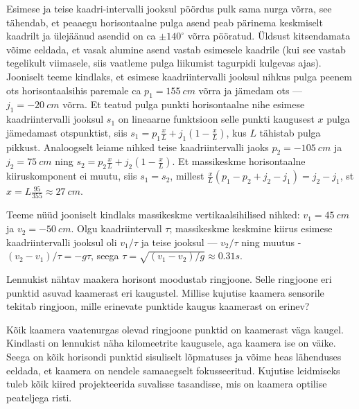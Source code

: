 \documentclass[10pt]{article}
\begin{document}

\solu
Esimese ja teise kaadri-intervalli jooksul pöördus pulk sama nurga võrra, see tähendab, et peaaegu horisontaalne pulga asend peab pärinema keskmiselt kaadrilt ja ülejäänud asendid on ca $\pm 140^\circ$ võrra pööratud. Üldsust kitsendamata võime eeldada, et vasak alumine asend vastab esimesele kaadrile (kui see vastab tegelikult viimasele, siis vaatleme pulga liikumist tagurpidi kulgevas ajas). Jooniselt teeme kindlaks, et esimese kaadriintervalli jooksul nihkus pulga peenem ots horisontaalsihis paremale ca $p_1=\SI{155}{cm}$ võrra ja jämedam ots --- $j_1=\SI{-20}{cm}$  võrra. Et teatud pulga punkti horisontaalne nihe esimese kaadriintervalli jooksul $s_1$ on lineaarne funktsioon selle punkti kaugusest $x$ pulga jämedamast otspunktist, siis $s_1=p_1\frac xL+j_1(1-\frac xL)$, kus $L$ tähistab pulga pikkust. Analoogselt leiame nihked teise kaadriintervalli jaoks $p_2=\SI{-105}{cm}$ ja $j_2=\SI{75}{cm}$ ning $s_2=p_2\frac xL+j_2(1-\frac xL)$. Et massikeskme horisontaalne kiiruskomponent ei muutu, siis $s_1=s_2$, millest $\frac xL(p_1-p_2+j_2-j_1)=j_2-j_1$, st $x=L\frac{95}{355}\approx \SI{27}{cm}$.

Teeme nüüd jooniselt kindlaks massikeskme vertikaalsihilised nihked: $v_1=\SI{45}{cm}$ ja $v_2=\SI{-50}{cm}$.
Olgu kaadriintervall $\tau$; massikeskme keskmine kiirus esimese kaadriintervalli jooksul oli $v_1/\tau$ ja teise jooksul --- $v_2/\tau$ ning muutus - $(v_2-v_1)/\tau= -g\tau$, seega $\tau=\sqrt{(v_1-v_2)/g}\approx \SI{0.31}s$.
\probend
\bigskip


\solu
Lennukist nähtav maakera horisont moodustab ringjoone. Selle ringjoone eri punktid asuvad kaamerast eri kaugustel. Millise kujutise kaamera sensorile tekitab ringjoon, mille erinevate punktide kaugus kaamerast on erinev?

Kõik kaamera vaatenurgas olevad ringjoone punktid on kaamerast väga kaugel. Kindlasti on lennukist näha kilomeetrite kaugusele, aga kaamera ise on väike. Seega on kõik horisondi punktid sisuliselt lõpmatuses ja võime heas lähenduses eeldada, et kaamera on nendele samaaegselt fokusseeritud. Kujutise leidmiseks tuleb kõik kiired projekteerida suvalisse tasandisse, mis on kaamera optilise peateljega risti.
\end{document}

